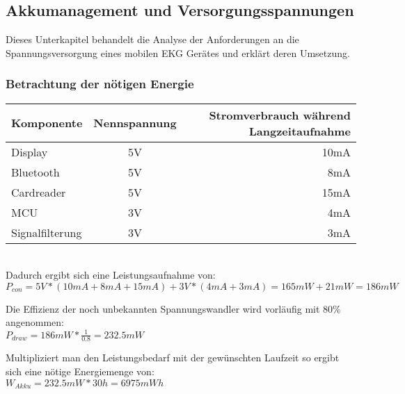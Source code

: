 

\subsection{Akkumanagement und Versorgungsspannungen}

Dieses Unterkapitel behandelt die Analyse der Anforderungen an die Spannungsversorgung eines mobilen EKG Gerätes und erklärt deren Umsetzung.

\subsubsection{Betrachtung der nötigen Energie}


%

\begin{tabular}[h]{l|c|r}
Komponente & Nennspannung & Stromverbrauch während Langzeitaufnahme\\
\hline
Display & 5V & 10mA \\
Bluetooth & 5V & 8mA \\
Cardreader & 5V & 15mA \\
MCU & 3V & 4mA \\
Signalfilterung & 3V & 3mA \\
\end{tabular}
\\
Dadurch ergibt sich eine Leistungsaufnahme von:\\
$ P_{con} = 5V * (10mA + 8mA + 15mA) + 3V * (4mA + 3mA) = 165mW + 21mW = 186mW $

Die Effizienz der noch unbekannten Spannungswandler wird vorläufig mit 80\% angenommen:\\
$P_{draw} = 186mW * \frac{1}{0.8} = 232.5mW $

Multipliziert man den Leistungsbedarf mit der gewünschten Laufzeit so ergibt sich eine nötige Energiemenge von:\\
$W_{Akku} = 232.5mW * 30h = 6975mWh$


